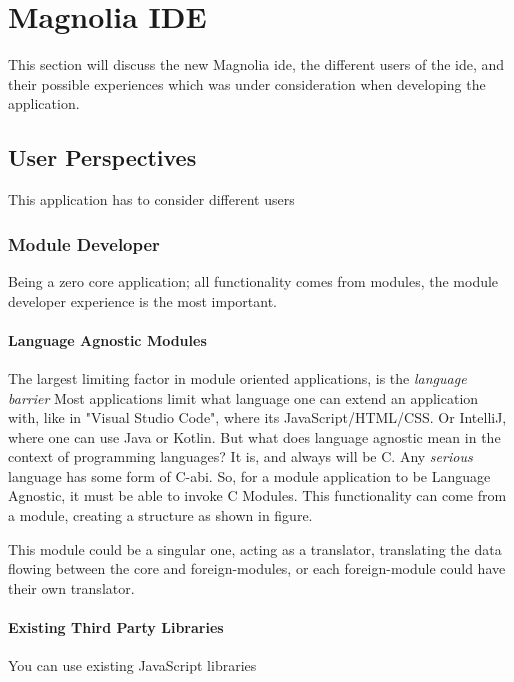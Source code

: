 \chapter{Magnolia IDE}

This section will discuss the new Magnolia \gls{ide}, the different users of the
\gls{ide}, and their possible experiences which was under consideration when
developing the application.

\section{User Perspectives}

This application has to consider different users

\subsection{Module Developer}

Being a zero core application; all functionality comes from modules, the module
developer experience is the most important.

\subsubsection{Language Agnostic Modules}

The largest limiting factor in module oriented applications, is the
\textit{language barrier} Most applications limit what language one can extend
an application with, like in "Visual Studio Code", where its
JavaScript/HTML/CSS. Or IntelliJ, where one can use Java or Kotlin. But what
does language agnostic mean in the context of programming languages? It is, and
always will be C. Any \textit{serious} language has some form of C-\gls{abi}.
So, for a module application to be Language Agnostic, it must be able to invoke
C Modules. This functionality can come from a module, creating a structure as
shown in figure. 

This module could be a singular one, acting as a translator, translating the
data flowing between the core and foreign-modules, or each foreign-module could
have their own translator.

\subsubsection{Existing Third Party Libraries}

You can use existing JavaScript libraries

